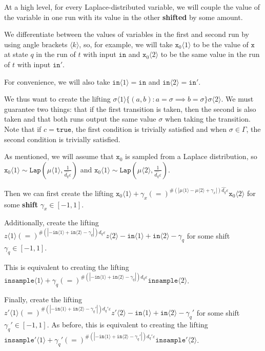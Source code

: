 \documentclass[12pt]{article}
\newcommand{\brangle}[1]{\langle #1 \rangle}
\newcommand{\Lap}{\texttt{Lap}}
\theoremstyle{definition}
\begin{document}
At a high level, for every Laplace-distributed variable, we will couple the value of the variable in one run with its value in the other \textbf{shifted} by some amount. 

We differentiate between the values of variables in the first and second run by using angle brackets $\brangle{k}$, so, for example, we will take $\texttt{x}_0\brangle{1}$ to be the value of $\texttt{x}$ at state $q$ in the run of $t$ with input $\texttt{in}$ and $\texttt{x}_0\brangle{2}$ to be the same value in the run of $t$ with input $\texttt{in}'$. 

For convenience, we will also take $\texttt{in}\brangle{1} = \texttt{in}$ and $\texttt{in}\brangle{2} =\texttt{in}'$. 

We thus want to create the lifting $\sigma\brangle{1}\{(a, b): a=\sigma\implies b=\sigma\}\sigma\brangle{2}$. We must guarantee two things: that if the first transition is taken, then the second is also taken and that both runs output the same value $\sigma$ when taking the transition. Note that if $c = \texttt{true}$, the first condition is trivially satisfied and when $\sigma\in \Gamma$, the second condition is trivially satisfied. 



As mentioned, we will assume that $\texttt{x}_0$ is sampled from a Laplace distribution, so $\texttt{x}_0\brangle{1}\sim \Lap(\mu\brangle{1}, \frac{1}{\hat{d_q}\varepsilon})$ and $\texttt{x}_0\brangle{1}\sim \Lap(\mu\brangle{2}, \frac{1}{\hat{d_q}\varepsilon})$.

Then we can first create the lifting $\texttt{x}_0\brangle{1}+\gamma_x (=)^{\#(|\mu\brangle{1}-\mu\brangle{2}+\gamma_x|)\hat{d_q}\varepsilon}\texttt{x}_0\brangle{2}$ for some \textbf{shift} $\gamma_x\in[-1, 1]$. 

Additionally, create the lifting $z\brangle{1} (=)^{\#(|-\texttt{in}\brangle{1}+\texttt{in}\brangle{2}-\gamma_q|)d_q\varepsilon}z\brangle{2} - \texttt{in}\brangle{1}+\texttt{in}\brangle{2}-\gamma_q$ for some shift $\gamma_q\in [-1, 1]$. 

This is equivalent to creating the lifting $\texttt{insample}\brangle{1} +\gamma_q{(=)}^{\#(|-\texttt{in}\brangle{1}+\texttt{in}\brangle{2}-\gamma_q|)d_q\varepsilon}\texttt{insample}\brangle{2}$.

Finally, create the lifting $z'\brangle{1} (=)^{\#(|-\texttt{in}\brangle{1}+\texttt{in}\brangle{2}-\gamma_q'|)d_q'\varepsilon}z'\brangle{2} - \texttt{in}\brangle{1}+\texttt{in}\brangle{2}-\gamma_q'$ for some shift $\gamma_q'\in [-1, 1]$. As before, this is equivalent to creating the lifting $\texttt{insample}'\brangle{1} +\gamma_q'{(=)}^{\#(|-\texttt{in}\brangle{1}+\texttt{in}\brangle{2}-\gamma_q'|)d_q'\varepsilon}\texttt{insample}'\brangle{2}$.
\end{document}
